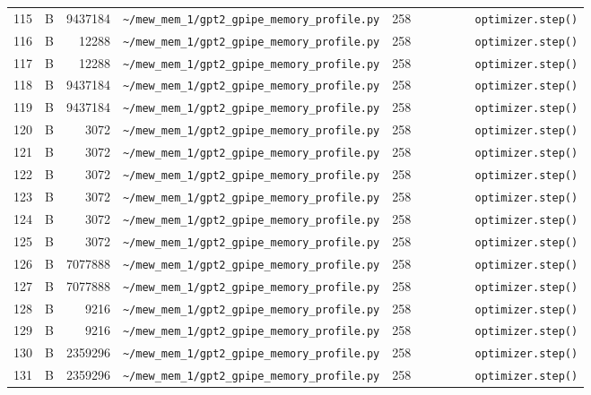 \documentclass{article}
\begin{document}
\begin{longtable}{r l r p{6.5cm} r p{7.0cm}}
115 & B & 9437184 & \lstinline|~/mew_mem_1/gpt2_gpipe_memory_profile.py| & 258 & \lstinline|        optimizer.step()| \\
116 & B & 12288 & \lstinline|~/mew_mem_1/gpt2_gpipe_memory_profile.py| & 258 & \lstinline|        optimizer.step()| \\
117 & B & 12288 & \lstinline|~/mew_mem_1/gpt2_gpipe_memory_profile.py| & 258 & \lstinline|        optimizer.step()| \\
118 & B & 9437184 & \lstinline|~/mew_mem_1/gpt2_gpipe_memory_profile.py| & 258 & \lstinline|        optimizer.step()| \\
119 & B & 9437184 & \lstinline|~/mew_mem_1/gpt2_gpipe_memory_profile.py| & 258 & \lstinline|        optimizer.step()| \\
120 & B & 3072 & \lstinline|~/mew_mem_1/gpt2_gpipe_memory_profile.py| & 258 & \lstinline|        optimizer.step()| \\
121 & B & 3072 & \lstinline|~/mew_mem_1/gpt2_gpipe_memory_profile.py| & 258 & \lstinline|        optimizer.step()| \\
122 & B & 3072 & \lstinline|~/mew_mem_1/gpt2_gpipe_memory_profile.py| & 258 & \lstinline|        optimizer.step()| \\
123 & B & 3072 & \lstinline|~/mew_mem_1/gpt2_gpipe_memory_profile.py| & 258 & \lstinline|        optimizer.step()| \\
124 & B & 3072 & \lstinline|~/mew_mem_1/gpt2_gpipe_memory_profile.py| & 258 & \lstinline|        optimizer.step()| \\
125 & B & 3072 & \lstinline|~/mew_mem_1/gpt2_gpipe_memory_profile.py| & 258 & \lstinline|        optimizer.step()| \\
126 & B & 7077888 & \lstinline|~/mew_mem_1/gpt2_gpipe_memory_profile.py| & 258 & \lstinline|        optimizer.step()| \\
127 & B & 7077888 & \lstinline|~/mew_mem_1/gpt2_gpipe_memory_profile.py| & 258 & \lstinline|        optimizer.step()| \\
128 & B & 9216 & \lstinline|~/mew_mem_1/gpt2_gpipe_memory_profile.py| & 258 & \lstinline|        optimizer.step()| \\
129 & B & 9216 & \lstinline|~/mew_mem_1/gpt2_gpipe_memory_profile.py| & 258 & \lstinline|        optimizer.step()| \\
130 & B & 2359296 & \lstinline|~/mew_mem_1/gpt2_gpipe_memory_profile.py| & 258 & \lstinline|        optimizer.step()| \\
131 & B & 2359296 & \lstinline|~/mew_mem_1/gpt2_gpipe_memory_profile.py| & 258 & \lstinline|        optimizer.step()| \\

\end{longtable}
\end{document}
